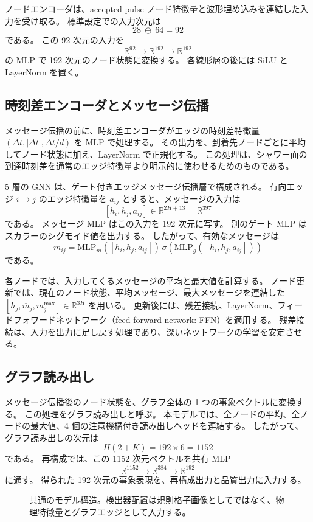 \documentclass[lualatex,paper=a4,fontsize=9pt]{jlreq}
\newcommand{\R}{\mathbb{R}}
\begin{document}
ノードエンコーダは、accepted-pulse ノード特徴量と波形埋め込みを連結した入力を受け取る。
標準設定での入力次元は
\[
  28\ \oplus\ 64 = 92
\]
である。
この 92 次元の入力を
\[
  \R^{92}\rightarrow\R^{192}\rightarrow\R^{192}
\]
の MLP で 192 次元のノード状態に変換する。
各線形層の後には SiLU と LayerNorm を置く。

\subsection{時刻差エンコーダとメッセージ伝播}

メッセージ伝播の前に、時刻差エンコーダがエッジの時刻差特徴量
$(\Delta t,|\Delta t|,\Delta t/d)$
を MLP で処理する。
その出力を、到着先ノードごとに平均してノード状態に加え、LayerNorm で正規化する。
この処理は、シャワー面の到達時刻差を通常のエッジ特徴量より明示的に使わせるためのものである。

5 層の GNN は、ゲート付きエッジメッセージ伝播層で構成される。
有向エッジ $i\rightarrow j$ のエッジ特徴量を $a_{ij}$ とすると、メッセージの入力は
\[
  [h_i,h_j,a_{ij}]\in\R^{2H+13}=\R^{397}
\]
である。
メッセージ MLP はこの入力を 192 次元に写す。
別のゲート MLP はスカラーのシグモイド値を出力する。
したがって、有効なメッセージは
\[
  m_{ij}=\mathrm{MLP}_m([h_i,h_j,a_{ij}])\,
  \sigma(\mathrm{MLP}_g([h_i,h_j,a_{ij}]))
\]
である。

各ノードでは、入力してくるメッセージの平均と最大値を計算する。
ノード更新では、現在のノード状態、平均メッセージ、最大メッセージを連結した
$[h_j,\overline{m}_j,m^{\max}_j]\in\R^{3H}$
を用いる。
更新後には、残差接続、LayerNorm、フィードフォワードネットワーク（feed-forward network: FFN）を適用する。
残差接続は、入力を出力に足し戻す処理であり、深いネットワークの学習を安定させる。

\subsection{グラフ読み出し}

メッセージ伝播後のノード状態を、グラフ全体の 1 つの事象ベクトルに変換する。
この処理をグラフ読み出しと呼ぶ。
本モデルでは、全ノードの平均、全ノードの最大値、4 個の注意機構付き読み出しヘッドを連結する。
したがって、グラフ読み出しの次元は
\[
  H(2+K)=192\times6=1152
\]
である。
再構成では、この 1152 次元ベクトルを共有 MLP
\[
  \R^{1152}\rightarrow\R^{384}\rightarrow\R^{192}
\]
に通す。
得られた 192 次元の事象表現を、再構成出力と品質出力に入力する。

\begin{figure}[p]
  \centering
  \resizebox{\linewidth}{!}{}
  \caption{共通のモデル構造。検出器配置は規則格子画像としてではなく、物理特徴量とグラフエッジとして入力する。}
  \label{fig:model_architecture}
\end{figure}
\end{document}
